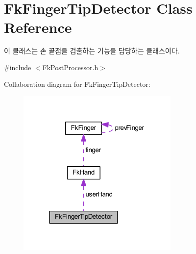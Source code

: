 \hypertarget{class_fk_finger_tip_detector}{}\section{Fk\+Finger\+Tip\+Detector Class Reference}
\label{class_fk_finger_tip_detector}


이 클래스는 손 끝점을 검출하는 기능을 담당하는 클래스이다.  




{\ttfamily \#include $<$Fk\+Post\+Processor.\+h$>$}



Collaboration diagram for Fk\+Finger\+Tip\+Detector\+:\nopagebreak
\begin{figure}[H]
\begin{center}
\leavevmode
\includegraphics[width=225pt]{class_fk_finger_tip_detector__coll__graph}
\end{center}
\end{figure}
